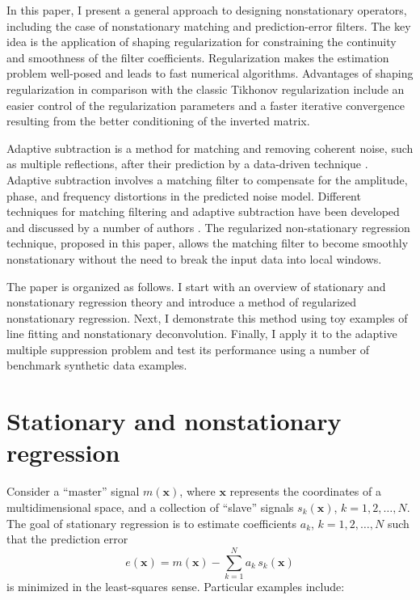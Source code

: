 In this paper, I present a general approach to designing nonstationary
operators, including the case of nonstationary matching and
prediction-error filters. The key idea is the application of shaping
regularization \cite[]{shape} for constraining the continuity and
smoothness of the filter coefficients. Regularization makes the
estimation problem well-posed and leads to fast numerical
algorithms. Advantages of shaping regularization in comparison with
the classic Tikhonov regularization include an easier control of the
regularization parameters and a faster iterative convergence resulting
from the better conditioning of the inverted matrix.

Adaptive subtraction is a method for matching and removing coherent
noise, such as multiple reflections, after their prediction by a
data-driven technique \cite[]{GEO57-09-11661177}. Adaptive subtraction
involves a matching filter to compensate for the amplitude, phase, and
frequency distortions in the predicted noise model. Different
techniques for matching filtering and adaptive subtraction have been developed and discussed by a number of authors
\cite[]{GEO57-09-11661177,GPR41-06-07250736,TLE18-01-00550058,TLE22-04-03400343,GEO68-01-03460354,GPR52-01-00270038,TLE24-03-02820284,TLE24-03-02770280,denisov}. The
regularized non-stationary regression technique, proposed in this
paper, allows the matching filter to become smoothly nonstationary
without the need to break the input data into local windows.

The paper is organized as follows. I start with an overview of
stationary and nonstationary regression theory and introduce a method
of regularized nonstationary regression. Next, I demonstrate this
method using toy examples of line fitting and nonstationary
deconvolution. Finally, I apply it to the adaptive multiple
suppression problem and test its performance using a number of
benchmark synthetic data examples.

\section{Stationary and nonstationary regression}
Consider a ``master'' signal $m(\mathbf{x})$, where $\mathbf{x}$
represents the coordinates of a multidimensional space, and a
collection of ``slave'' signals $s_k(\mathbf{x})$, $k=1,2,\ldots,N$.
The goal of stationary regression is to estimate coefficients $a_k$,
$k=1,2,\ldots,N$ such that the prediction error
\begin{equation}
  \label{eq:pred}
  e(\mathbf{x}) = m(\mathbf{x}) - \sum_{k=1}^{N} a_k\,s_k(\mathbf{x})
\end{equation}
is minimized in the least-squares sense. Particular examples include:

